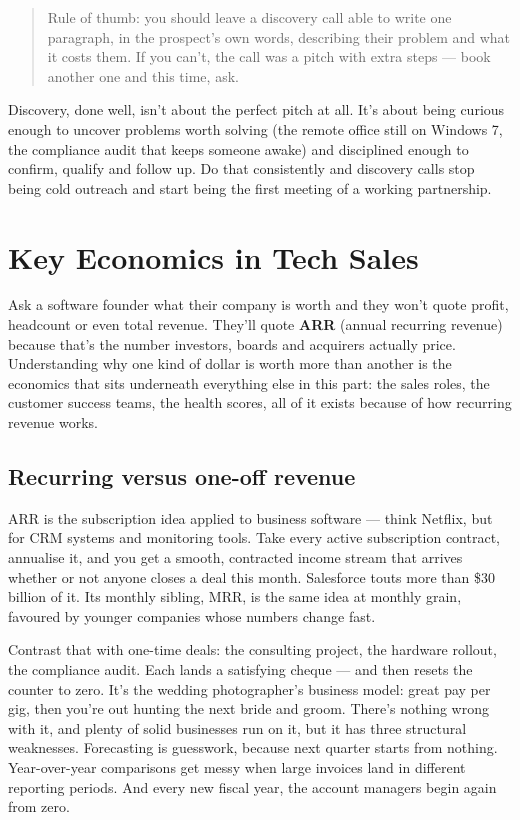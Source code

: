 \begin{quote}\small
Rule of thumb: you should leave a discovery call able to write one paragraph, in the prospect's own words, describing their problem and what it costs them. If you can't, the call was a pitch with extra steps — book another one and this time, ask.
\end{quote}


Discovery, done well, isn't about the perfect pitch at all. It's about being curious enough to uncover problems worth solving (the remote office still on Windows 7, the compliance audit that keeps someone awake) and disciplined enough to confirm, qualify and follow up. Do that consistently and discovery calls stop being cold outreach and start being the first meeting of a working partnership.

\section{Key Economics in Tech Sales}
Ask a software founder what their company is worth and they won't quote profit, headcount or even total revenue. They'll quote \textbf{ARR} (annual recurring revenue) because that's the number investors, boards and acquirers actually price. Understanding why one kind of dollar is worth more than another is the economics that sits underneath everything else in this part: the sales roles, the customer success teams, the health scores, all of it exists because of how recurring revenue works.



\subsection{Recurring versus one-off revenue}


ARR is the subscription idea applied to business software — think Netflix, but for CRM systems and monitoring tools. Take every active subscription contract, annualise it, and you get a smooth, contracted income stream that arrives whether or not anyone closes a deal this month. Salesforce touts more than \$30 billion of it. Its monthly sibling, MRR, is the same idea at monthly grain, favoured by younger companies whose numbers change fast.


Contrast that with one-time deals: the consulting project, the hardware rollout, the compliance audit. Each lands a satisfying cheque — and then resets the counter to zero. It's the wedding photographer's business model: great pay per gig, then you're out hunting the next bride and groom. There's nothing wrong with it, and plenty of solid businesses run on it, but it has three structural weaknesses. Forecasting is guesswork, because next quarter starts from nothing. Year-over-year comparisons get messy when large invoices land in different reporting periods. And every new fiscal year, the account managers begin again from zero.


